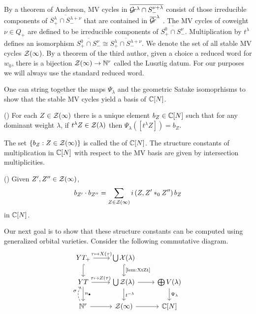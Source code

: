 \documentclass{article}
\begin{document}
By a theorem of Anderson, MV cycles in $\overline{\mathcal{G}\!r^\lambda\cap S^{\nu + \lambda}_-}$ consist of those irreducible components of $ \overline{S^\lambda_+ \cap S^{\lambda+\nu}_-} $ that are contained in $\overline{\mathcal{G}\!r}^\lambda$ \cite[Proposition~3]{anderson2003polytope}. The  MV cycles of coweight $\nu\in Q_+$ are defined to be irreducible components of $\overline{S^0_+ \cap S^\nu_-}$.  Multiplication by $ t^\lambda $ defines an isomorphism $\overline{S^0_+ \cap S^\nu_-} \cong \overline{S^\lambda_+ \cap S^{\lambda+\nu}_-} $.  We denote the set of all stable MV cycles $\mathcal Z(\infty)$. 
% 
By a theorem of the third author, given a choice a reduced word for $ w_0 $, there is a bijection $ \mathcal Z(\infty) \rightarrow \mathbb N^{r} $ called the Lusztig datum.  For our purposes we will always use the standard reduced word.

One can string together the maps $\Psi_\lambda$ and the geometric Satake isomoprhisms to show that the stable MV cycles yield a basis of $\mathbb C[N]$.  

\begin{theorem}
(\cite[Proposition~6.1]{baumann2019mirkovic})
    For each $Z\in\mathcal Z(\infty)$ there is a unique element $b_Z\in\mathbb C[N]$ such that for any dominant weight $\lambda$, if $t^\lambda Z\in\mathcal Z(\lambda)$ then $\Psi_\lambda([t^\lambda Z]) = b_Z$.
\end{theorem}
% 
The set $ \{b_Z : Z \in \mathcal Z(\infty) \}$ is called the  of $ \mathbb C[N]$.  The structure constants of multiplication in $\mathbb C[N]$ with respect to the MV basis are given by intersection multiplicities. 
% 
\begin{theorem}
(\cite[Theorem~7.11]{baumann2019mirkovic}) 
    Given $Z',Z''\in\mathcal Z(\infty)$, 
\begin{equation}
\label{eq:btimesb}
    b_{Z'}\cdot b_{Z''} = \sum_{Z\in\mathcal Z(\infty)} i\left(Z, Z' \ast_{0} Z''\right) b_Z 
\end{equation}
in $\mathbb C[N]$. 
\end{theorem}
Our next goal is to show that these structure constants can be computed using generalized orbital varieties. Consider the following commutative diagram.
\[
\begin{tikzcd}
    YT_+ \ar[r,"\tau\mapsto X(\tau)"]\ar[d,hook] & \bigcup \mathcal X(\lambda) \ar[d,hook,"\text{\Cref{lem:XtZt}}"] & \\
    YT      \ar[r,"\tau\mapsto Z(\tau)"] \ar[d,"n_\bullet"] & \bigcup\cZ(\lambda) \ar[r] \ar[d, "t^{-\lambda}"] & \bigoplus V(\lambda) \ar[d, "\Psi_\lambda"] \\ 
    \NN^{r} \ar[r] \ar[u,dashed,bend left,"\sigma"]         & \cZ(\infty) \ar[r]                                & \CC[N] 
\end{tikzcd}
\]
\end{document}

